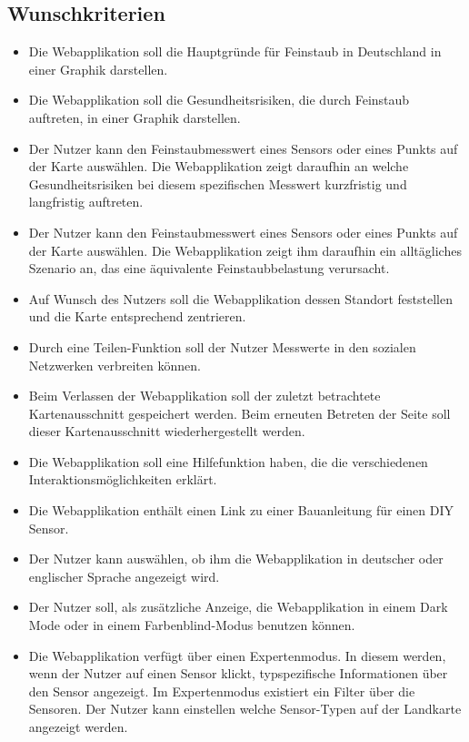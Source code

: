 \subsection{Wunschkriterien}
   \begin{itemize}
   	\item Die Webapplikation soll die Hauptgründe für \gls{Feinstaub} in Deutschland in einer Graphik darstellen.
   	\item Die Webapplikation soll die Gesundheitsrisiken, die durch \gls{Feinstaub} auftreten, in einer Graphik darstellen. 
	\item Der Nutzer kann den Feinstaubmesswert eines Sensors oder eines Punkts auf der Karte auswählen. 
	Die Webapplikation zeigt daraufhin an welche Gesundheitsrisiken bei diesem spezifischen Messwert kurzfristig und langfristig auftreten.
	\item Der Nutzer kann den Feinstaubmesswert eines Sensors oder eines Punkts auf der Karte auswählen. 
	Die Webapplikation zeigt ihm daraufhin ein alltägliches Szenario an, das eine äquivalente Feinstaubbelastung verursacht.
	\item Auf Wunsch des Nutzers soll die Webapplikation dessen Standort feststellen und die Karte entsprechend zentrieren.
	\item Durch eine Teilen-Funktion soll der Nutzer Messwerte in den sozialen Netzwerken verbreiten können.
	\item Beim Verlassen der Webapplikation soll der zuletzt betrachtete Kartenausschnitt gespeichert werden. Beim erneuten Betreten der Seite soll dieser Kartenausschnitt wiederhergestellt werden.
	\item Die Webapplikation soll eine Hilfefunktion haben, die die verschiedenen Interaktionsmöglichkeiten erklärt.
	\item Die Webapplikation enthält einen Link zu einer Bauanleitung für einen \gls{DIY} \gls{Sensor}.
	\item Der Nutzer kann auswählen, ob ihm die Webapplikation in deutscher oder englischer Sprache angezeigt wird.
	\item Der Nutzer soll, als zusätzliche Anzeige, die Webapplikation in einem Dark Mode oder in einem Farbenblind-Modus benutzen können.
	\item Die Webapplikation verfügt über einen Expertenmodus. In diesem werden, wenn der Nutzer auf einen Sensor klickt, typspezifische Informationen über den \gls{Sensor} angezeigt.
	Im Expertenmodus existiert ein Filter über die Sensoren. Der Nutzer kann einstellen welche \gls{Sensor}-Typen auf der Landkarte angezeigt werden.        
\end{itemize}
